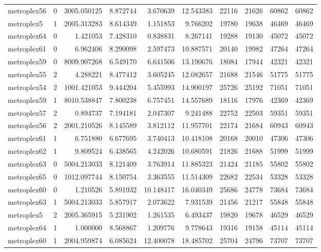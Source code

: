 \begin{longtable}{|l|r|r|r|r|r|r|r|r|r|}
metroplex56 & 0 & 3005.050125 & 8.872744 & 3.670639 & 12.543383 & 22116 & 21626 & 60862 & 60862 \\
metroplex5 & 1 & 2005.313283 & 8.614349 & 1.151853 & 9.766202 & 19780 & 19638 & 46469 & 46469 \\
metroplex64 & 0 & 1.421053 & 7.428310 & 0.838831 & 8.267141 & 19288 & 19130 & 45072 & 45072 \\
metroplex61 & 0 & 6.962406 & 8.290098 & 2.597473 & 10.887571 & 20140 & 19982 & 47264 & 47264 \\
metroplex59 & 0 & 8009.907268 & 6.549170 & 6.641506 & 13.190676 & 18084 & 17944 & 42321 & 42321 \\
metroplex55 & 2 & 4.288221 & 8.477412 & 3.605245 & 12.082657 & 21688 & 21546 & 51775 & 51775 \\
metroplex54 & 2 & 1001.421053 & 9.444204 & 5.455993 & 14.900197 & 25726 & 25192 & 71051 & 71051 \\
metroplex59 & 1 & 8010.538847 & 7.800238 & 6.757451 & 14.557689 & 18116 & 17976 & 42369 & 42369 \\
metroplex57 & 2 & 0.894737 & 7.194181 & 2.047307 & 9.241488 & 22752 & 22503 & 59351 & 59351 \\
metroplex56 & 2 & 2001.210526 & 8.145589 & 3.812112 & 11.957701 & 22174 & 21684 & 60943 & 60943 \\
metroplex61 & 1 & 6.751880 & 6.677695 & 3.740413 & 10.418108 & 20168 & 20010 & 47306 & 47306 \\
metroplex62 & 1 & 9.809524 & 6.438565 & 4.242026 & 10.680591 & 21826 & 21688 & 51999 & 51999 \\
metroplex63 & 0 & 5004.213033 & 8.121409 & 3.763914 & 11.885323 & 21424 & 21185 & 55802 & 55802 \\
metroplex65 & 0 & 1012.097744 & 8.150754 & 3.363555 & 11.514309 & 22682 & 22534 & 53328 & 53328 \\
metroplex60 & 0 & 1.210526 & 5.891932 & 10.148417 & 16.040349 & 25686 & 24778 & 73684 & 73684 \\
metroplex63 & 1 & 5004.213033 & 5.857917 & 2.073622 & 7.931539 & 21456 & 21217 & 55848 & 55848 \\
metroplex5 & 2 & 2005.365915 & 5.231902 & 1.261535 & 6.493437 & 19820 & 19678 & 46529 & 46529 \\
metroplex64 & 1 & 1.000000 & 8.568867 & 1.209776 & 9.778643 & 19316 & 19158 & 45114 & 45114 \\
metroplex60 & 1 & 2004.959874 & 6.085624 & 12.400078 & 18.485702 & 25704 & 24796 & 73707 & 73707 \\

\end{longtable}
